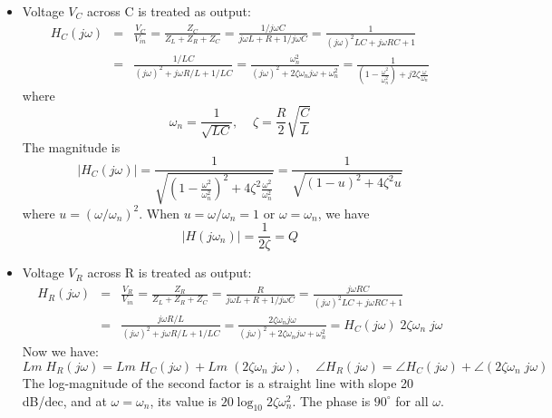 \documentclass{article}
\begin{document}
\begin{itemize}
\item Voltage $V_C$ across C is treated as output:
  \begin{eqnarray}
    H_C(j\omega)&=&\frac{V_C}{V_{in}}=\frac{Z_C}{Z_L+Z_R+Z_C}
    =\frac{1/j\omega C}{j\omega L+R+1/j\omega C}
    =\frac{1}{(j\omega)^2 LC+j\omega RC+1}
    \nonumber \\
    &=&\frac{1/LC}{(j\omega)^2 +j\omega R/L+1/LC}
    =\frac{\omega_n^2}{(j\omega)^2 +2\zeta\omega_n j\omega+\omega^2_n} 
    =\frac{1}{(1-\frac{\omega^2}{\omega_n^2})+j2\zeta\frac{\omega}{\omega_n}}
  \end{eqnarray}
  where 
  \begin{equation} \omega_n=\frac{1}{\sqrt{LC}},\;\;\;\;\zeta=\frac{R}{2}\sqrt{\frac{C}{L}} \end{equation}
  The magnitude is
  \begin{equation} |H_C(j\omega)|
  =\frac{1}{\sqrt{(1-\frac{\omega^2}{\omega_n^2})^2+4\zeta^2 \frac{\omega^2}{\omega_n^2}}}
  =\frac{1}{\sqrt{(1-u)^2+4\zeta^2 u}} \end{equation}
  where $u=(\omega/\omega_n)^2$. When $u=\omega/\omega_n=1$ or $\omega=\omega_n$, we have
  \begin{equation} | H(j\omega_n) |=\frac{1}{2\zeta}=Q \end{equation}
\item Voltage $V_R$ across R is treated as output:
  \begin{eqnarray}
    H_R(j\omega)&=&\frac{V_R}{V_{in}}=\frac{Z_R}{Z_L+Z_R+Z_C}
    =\frac{R}{j\omega L+R+1/j\omega C}
    =\frac{j\omega RC}{(j\omega)^2 LC+j\omega RC+1}
    \nonumber \\
    &=&\frac{j\omega R/L}{(j\omega)^2 +j\omega R/L+1/LC}
    =\frac{2\zeta\omega_nj\omega}{(j\omega)^2 +2\zeta\omega_n j\omega+\omega^2_n} 
    =H_C(j\omega) \;2\zeta \omega_n\;j \omega 
  \end{eqnarray}
  Now we have:
  \begin{equation} Lm\;H_R(j\omega)=Lm\; H_C(j\omega)+Lm\;(2\zeta\omega_n\;j\omega),\;\;\;\;
  \angle H_R(j\omega)=\angle H_C(j\omega)+\angle(2\zeta\omega_n\;j\omega) \end{equation}
  The log-magnitude of the second factor is a straight line with slope 20 dB/dec,
  and at $\omega=\omega_n$, its value is $20\log_{10} 2\zeta\omega_n^2$. The phase is 
  $90^\circ$ for all $\omega$.
  

\end{itemize}
\end{document}
